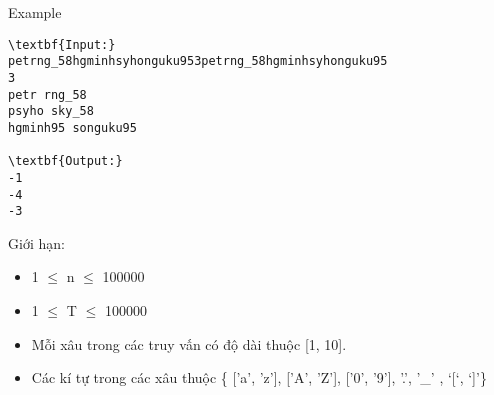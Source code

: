 Example
\begin{verbatim}
\textbf{Input:}
petrng_58hgminhsyhonguku953petrng_58hgminhsyhonguku95
3
petr rng_58
psyho sky_58
hgminh95 songuku95

\textbf{Output:}
-1
-4
-3

\end{verbatim}
Giới hạn:
\begin{itemize}
	\item        1  $\le$  n  $\le$  100000      
	\item          1  $\le$  T  $\le$  100000        
	\item            Mỗi xâu trong các truy vấn có độ dài thuộc [1, 10].          
	\item              Các kí tự trong các xâu thuộc \{ ['a', 'z'], ['A', 'Z'], ['0', '9'], '.', '\_' , ‘[‘, ‘]’\}            
\end{itemize}